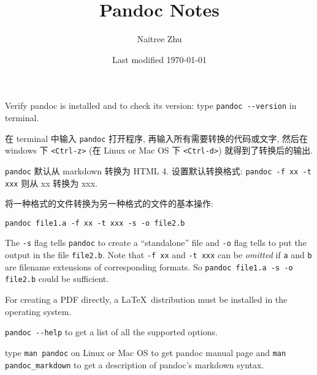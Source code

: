 \documentclass{article}
\title{Pandoc Notes}
\author{Naitree Zhu}
\date{Last modified \today}
\newcommand{\dq}[1]{``#1''}
\begin{document}
\maketitle

Verify \textsf{pandoc} is installed and to check its version: type
\verb|pandoc --version| in terminal.

在 terminal 中输入 \verb|pandoc| 打开程序, 再输入所有需要转换的代码或文字, 然后在 windows 下 \verb|<Ctrl-z>| (在 Linux or Mac OS 下 \verb|<Ctrl-d>|) 就得到了转换后的输出.

\verb|pandoc| 默认从 markdown 转换为 HTML 4. 设置默认转换格式: \verb|pandoc -f xx -t xxx| 则从 xx 转换为 xxx.

将一种格式的文件转换为另一种格式的文件的基本操作:

\begin{verbatim}
pandoc file1.a -f xx -t xxx -s -o file2.b
\end{verbatim}

The \verb|-s| flag tells \verb|pandoc| to create a \dq{standalone} file and \verb|-o| flag tells to put the output in the file \verb|file2.b|. Note that \verb|-f xx| and \verb|-t xxx| can be \emph{omitted} if \verb|a| and \verb|b| are filename extensions of corresponding formats. So \verb|pandoc file1.a -s -o file2.b| could be sufficient.

For creating a PDF directly, a \LaTeX~distribution must be installed in the operating system.

\verb|pandoc --help| to get a list of all the supported options.

type \verb|man pandoc| on Linux or Mac OS to get \textsf{pandoc} manual page and \verb|man pandoc_markdown| to get a description of pandoc's markdown syntax.
\end{document}
